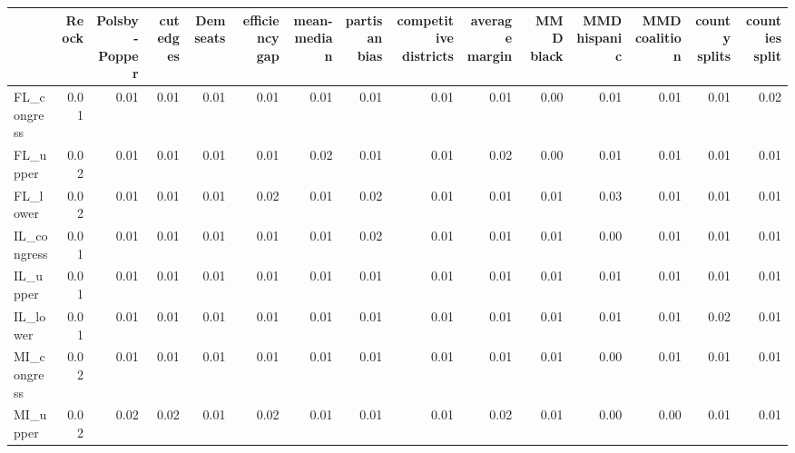 \begin{tabular}{lrrrrrrrrrrrrrr}
\toprule
{} &  Reock &  Polsby-Popper &  cut edges &  Dem seats &  efficiency gap &  mean-median &  partisan bias &  competitive districts &  average margin &  MMD black &  MMD hispanic &  MMD coalition &  county splits &  counties split \\
\midrule
FL\_congress &   0.01 &           0.01 &       0.01 &       0.01 &            0.01 &         0.01 &           0.01 &                   0.01 &            0.01 &       0.00 &          0.01 &           0.01 &           0.01 &            0.02 \\
FL\_upper    &   0.02 &           0.01 &       0.01 &       0.01 &            0.01 &         0.02 &           0.01 &                   0.01 &            0.02 &       0.00 &          0.01 &           0.01 &           0.01 &            0.01 \\
FL\_lower    &   0.02 &           0.01 &       0.01 &       0.01 &            0.02 &         0.01 &           0.02 &                   0.01 &            0.01 &       0.01 &          0.03 &           0.01 &           0.01 &            0.01 \\
IL\_congress &   0.01 &           0.01 &       0.01 &       0.01 &            0.01 &         0.01 &           0.02 &                   0.01 &            0.01 &       0.01 &          0.00 &           0.01 &           0.01 &            0.01 \\
IL\_upper    &   0.01 &           0.01 &       0.01 &       0.01 &            0.01 &         0.01 &           0.01 &                   0.01 &            0.01 &       0.01 &          0.01 &           0.01 &           0.01 &            0.01 \\
IL\_lower    &   0.01 &           0.01 &       0.01 &       0.01 &            0.01 &         0.01 &           0.01 &                   0.01 &            0.01 &       0.01 &          0.01 &           0.01 &           0.02 &            0.01 \\
MI\_congress &   0.02 &           0.01 &       0.01 &       0.01 &            0.01 &         0.01 &           0.01 &                   0.01 &            0.01 &       0.01 &          0.00 &           0.01 &           0.01 &            0.01 \\
MI\_upper    &   0.02 &           0.02 &       0.02 &       0.01 &            0.02 &         0.01 &           0.01 &                   0.01 &            0.02 &       0.01 &          0.00 &           0.00 &           0.01 &            0.01 \\

\end{tabular}
